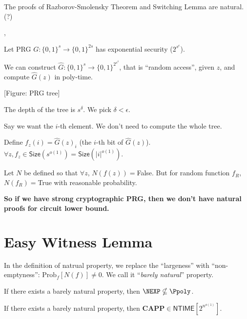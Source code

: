 \documentclass[letterpaper, 12pt]{article}
\newcommand{\CAPP}{\mathbf{CAPP}}
\newcommand{\NTime}[1]{\mathsf{NTIME}[#1]}
\newcommand{\Size}[1]{\mathsf{Size}(#1)}
\newcommand{\Prob}[2]{\mathrm{Prob}_{#1}[#2]}
\newcommand{\subexp}{2^{n^{o(1)}}}
\begin{document}
The proofs of Razborov-Smolensky Theorem and Switching Lemma are natural. (?)

\sep

Let PRG $G: \{0,1\}^s \rightarrow \{0,1\}^{2s}$ has exponential security ($2^{s^\epsilon}$).

We can construct $\hat{G} : \{0,1\}^s \rightarrow \{0,1\}^{2^{s^\delta}}$, that is ``random access'', given $z$, and compute $\hat{G}(z)$ in poly-time.

[Figure: PRG tree]

The depth of the tree is $s^\delta$. We pick $\delta < \epsilon$.

Say we want the $i$-th element. We don't need to compute the whole tree.

Define $f_z(i) = \hat{G}(z)_i$ (the $i$-th bit of $\hat{G}(z)$).
$\forall z, f_z \in \Size{s^{o(1)}} = \Size{|i|^{o(1)}}$.

Let $N$ be defined so that $\forall z$, $N(f(z)) = $False. But for random function $f_R$, $N(f_R) =$True with reasonable probability.

\textbf{So if we have strong cryptographic PRG, then we don't have natural proofs for circuit lower bound.}

\section{Easy Witness Lemma}

In the definition of natrual property, we replace the ``largeness'' with ``non-emptyness'': $\Prob{f}{N(f)} \neq 0$. We call it ``\emph{barely natural}'' property.

\begin{theorem}\label{thm1}
	If there exists a barely natural property, then $\NEXP \nsubseteq \Ppoly$.
\end{theorem}

\begin{lemma}
	If there exists a barely natural property, then $\CAPP \in \NTime{\subexp}$.
\end{lemma}
\end{document}
